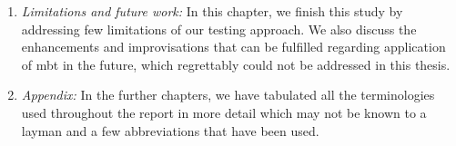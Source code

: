 \begin{enumerate}
\item \textit{Limitations and future work: } In this chapter, we finish this study by addressing few limitations of our testing approach. We also discuss the enhancements and improvisations that can be fulfilled regarding application of \acrshort{mbt} in the future, which regrettably could not be addressed in this thesis.

\item \textit{Appendix: } In the further chapters, we have tabulated all the terminologies used throughout the report in more detail which may not be known to a layman and a few abbreviations that have been used.
    
\end{enumerate}